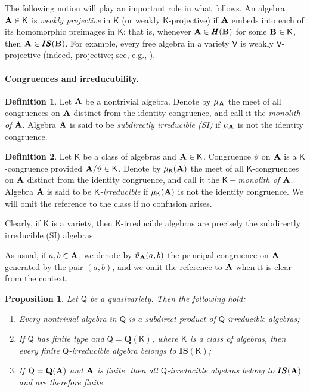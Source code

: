 \documentclass[submission,copyright,creativecommons]{eptcs}
\newtheorem{prop}[theorem]{Proposition}
\theoremstyle{definition}
\newtheorem{definition}{Definition}
\newcommand{\alg}[1]{{{\textbf{\upshape #1}}}}
\newcommand{\QQ}{\mathbf{Q}}
\newcommand{\SU}{\pmb{S}}
\newcommand{\II}{\pmb{I}}
\newcommand{\HH}{\pmb{H}}
\newcommand{\vv}[1]{\mathsf {#1}}
\newcommand{\Def}[1]{\textit{#1}}
\newcommand{\vt}{\vartheta}
\begin{document}
The following notion will play an important role in what follows. An algebra $\alg A \in \vv K$ is \Def{weakly projective} in $\vv K$ (or weakly $\vv K$-projective) if $\alg A$ embeds into each of its homomorphic preimages in $\vv K$; that is, whenever $\alg A \in \HH(\alg B)$ for some $\alg B \in \vv K$, then $\alg A \in \II\SU(\alg B)$. For example, every free algebra in a variety $\vv V$ is weakly $\vv V$-projective (indeed, projective; see, e.g., \cite{GraetzerB}).

\paragraph{Congruences and irreducubility.}


\begin{definition}
	Let $\alg A$ be a nontrivial algebra. Denote by $\mu_{\alg A}$ the meet of all congruences on $\alg A$ distinct from the identity congruence, and call it the \Def{monolith of} $\alg A$. Algebra $\alg A$ is said to be \Def{subdirectly irreducible (SI)} if $\mu_{\alg A}$ is not the identity congruence.
\end{definition}


\begin{definition}
	Let $\vv K$ be a class of algebras and $\alg A \in \vv K$.
	Congruence $\vt$ on $\alg A$ is a \Def{$\vv K$}-congruence provided $\alg A/\vt \in \vv K$.
	Denote by $\mu_\vv K(\alg A)$ the meet of all $\vv K$-congruences on $\alg A$ distinct from the identity congruence, and call it the $\vv K-$\Def{monolith of} $\alg A$. Algebra $\alg A$ is said to be \Def{$\vv K$-irreducible} if $\mu_\vv K(\alg A)$ is not the identity congruence. We will omit the reference to the class if no confusion arises. 
\end{definition}
Clearly, if  $\vv K$ is a variety, then $\vv K$-irreducible algebras are precisely the subdirectly irreducible (SI) algebras.

As usual, if $a,b \in \alg A$, we denote by $\vt_{\alg A}(a,b)$ the principal congruence on $\alg A$ generated by the pair $(a,b)$, and we omit the reference to $\alg A$ when it is clear from the context.

\begin{prop}\label{pr-qirr} 
	Let $\vv Q$ be a quasivariety. Then the following hold:
	\begin{enumerate}
		\item[(a)] Every nontrivial algebra in $\vv Q$ is a subdirect product of $\vv Q$-irreducible algebras;
		
		\item[(b)] If $\vv Q$ has finite type and $\vv Q = \QQ(\vv K)$, where $\vv K$ is a class of algebras, then every finite $\vv Q$-irreducible algebra belongs to $\II\SU(\vv K)$;
		
		\item[(c)] If $\vv Q = \QQ(\alg A)$ and $\alg A$ is finite, then all $\vv Q$-irreducible algebras belong to $\II\SU(\alg A)$ and are therefore finite.
	\end{enumerate} 
\end{prop}
\end{document}
